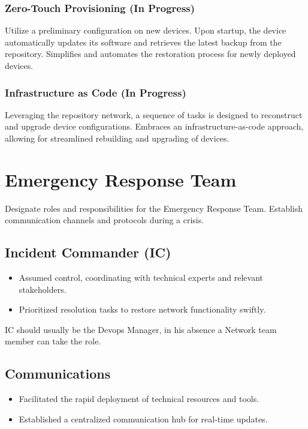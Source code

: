 \subsubsection{Zero-Touch Provisioning (In Progress)}
Utilize a preliminary configuration on new devices.
Upon startup, the device automatically updates its software and retrieves the latest backup from the repository.
Simplifies and automates the restoration process for newly deployed devices.

\subsubsection{Infrastructure as Code (In Progress)}
Leveraging the repository network, a sequence of tasks is designed to reconstruct and upgrade device configurations.
Embraces an infrastructure-as-code approach, allowing for streamlined rebuilding and upgrading of devices.

\section{Emergency Response Team}
Designate roles and responsibilities for the Emergency Response Team.
Establish communication channels and protocols during a crisis.
\subsection{Incident Commander (IC)}

\begin{itemize}
    \item Assumed control, coordinating with technical experts and relevant stakeholders.
    \item Prioritized resolution tasks to restore network functionality swiftly.
\end{itemize}

IC should usually be the Devops Manager, in his absence a Network team member can take the role.

\subsection{Communications}

\begin{itemize}
    \item Facilitated the rapid deployment of technical resources and tools.
    \item Established a centralized communication hub for real-time updates.
\end{itemize}

